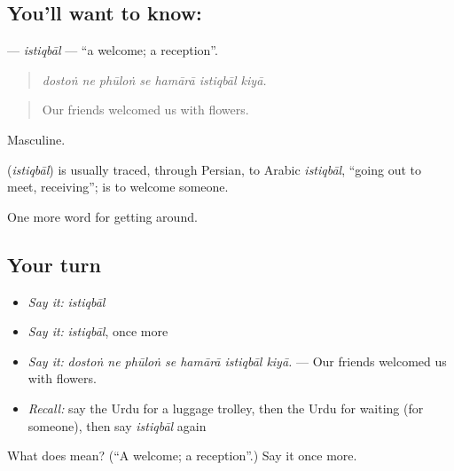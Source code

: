 \subsection*{You'll want to know: }
\textbf{} — \emph{istiqbāl} — \textquotedblleft{}a welcome; a reception\textquotedblright{}.

\begin{quote}
      
\end{quote}

\begin{quote}
\emph{dostoṅ ne phūloṅ se hamārā istiqbāl kiyā.}
\end{quote}

\begin{quote}
Our friends welcomed us with flowers.
\end{quote}

Masculine.

\begin{cousinweb}
\textbf{} (\emph{istiqbāl}) is usually traced, through Persian, to Arabic \emph{istiqbāl}, \textquotedblleft{}going out to meet, receiving\textquotedblright{}; \textbf{ } is to welcome someone.
\end{cousinweb}

\begin{grammarlens}[title={What you've built}]
One more word for getting around.
\end{grammarlens}

\subsection*{Your turn}
\begin{itemize}
\raggedright
  \item \emph{Say it:} \emph{istiqbāl}
  \item \emph{Say it:} \emph{istiqbāl}, once more
  \item \emph{Say it:} \emph{dostoṅ ne phūloṅ se hamārā istiqbāl kiyā.} — Our friends welcomed us with flowers.
  \item \emph{Recall:} say the Urdu for a luggage trolley, then the Urdu for waiting (for someone), then say \emph{istiqbāl} again
\end{itemize}

\begin{tcolorbox}[breakable,colback=teal!4,colframe=teal!35!black,title={Before you move on}]
What does  mean? (\textquotedblleft{}A welcome; a reception\textquotedblright{}.) Say it once more.
\end{tcolorbox}
